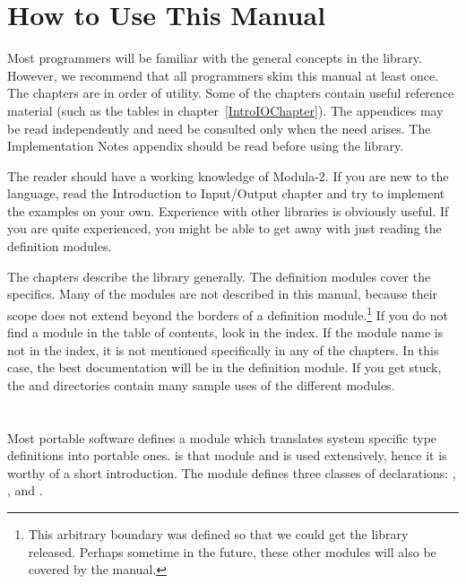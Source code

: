 \section{How to Use This Manual}

Most programmers will be familiar with the general concepts in the
library.  However, we recommend that all programmers skim this manual
at least once.  The chapters are in order of utility.  Some of the
chapters contain useful reference material (such as the
 tables in chapter~\ref{IntroIOChapter}).
The appendices may be read independently and need be consulted only 
when the need arises.  The Implementation Notes appendix should be
read before using the library.  

The reader should have a working knowledge of Modula-2.  If you
are new to the language, read the Introduction to Input/Output
chapter and try to implement the examples on your own.  Experience
with other libraries is obviously useful.  If you are quite experienced,
you might be able to get away with just reading the definition modules.

The chapters describe the library generally.
The definition modules cover the specifics.  Many of the modules
are not described in this manual, because their scope does not
extend beyond the borders of a definition module.\footnote{
    This arbitrary boundary was defined so that we could get
    the library released.  Perhaps sometime in the future, these
    other modules will also be covered by the manual.
    }
If you do not find a module in the table of contents, look in the
index.   If the module name is not in the index, it is not mentioned
specifically in any of the chapters.  In this case, the best documentation
will be in the definition module.  
If you get stuck, the  and  directories 
contain many sample uses of the different modules.

\section{}

Most portable software defines a module which translates system
specific type definitions into portable ones.
 is that module and is used extensively, hence
it is worthy of a short introduction.
The module  defines three classes of declarations:
, 
, and
.

